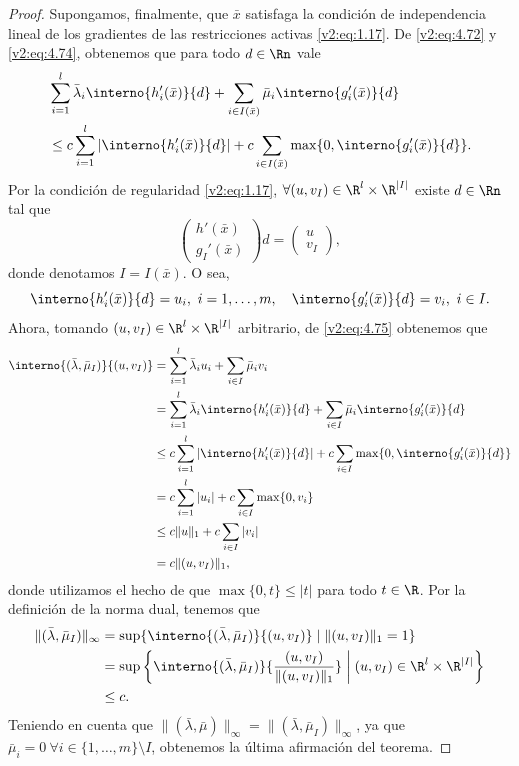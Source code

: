 \begin{proof}
    Supongamos, finalmente, que $\bar{x}$ satisfaga la condición de independencia lineal de los gradientes de las restricciones activas \eqref{v2:eq:1.17}. De \eqref{v2:eq:4.72} y \eqref{v2:eq:4.74}, obtenemos que para todo $d \in \Rn$ vale
    \begin{align}
        &\sum_{i=1}^l \bar{\lambda}_i \interno{h_i'(\bar{x})}{d} + \sum_{i \in I(\bar{x})} \bar{\mu}_i \interno{g_i'(\bar{x})}{d} \nonumber \\
        &\le c \sum_{i=1}^l |\interno{h_i'(\bar{x})}{d}| + c \sum_{i \in I(\bar{x})} \max\{0, \interno{g_i'(\bar{x})}{d}\}. \label{v2:eq:4.75}
    \end{align}
    Por la condición de regularidad \eqref{v2:eq:1.17}, $\forall (u, v_I) \in \R^l \times \R^{|I|}$ existe $d \in \Rn$ tal que
    \[
        \begin{pmatrix} h'(\bar{x}) \\ g_I'(\bar{x}) \end{pmatrix} d = \begin{pmatrix} u \\ v_I \end{pmatrix},
    \]
    donde denotamos $I = I(\bar{x})$. O sea,
    \[
        \interno{h_i'(\bar{x})}{d} = u_i, \ i = 1, \dots, m, \quad \interno{g_i'(\bar{x})}{d} = v_i, \ i \in I.
    \]
    Ahora, tomando $(u, v_I) \in \R^l \times \R^{|I|}$ arbitrario, de \eqref{v2:eq:4.75} obtenemos que
    \begin{align*}
        \interno{(\bar{\lambda}, \bar{\mu}_I)}{(u, v_I)} &= \sum_{i=1}^l \bar{\lambda}_i u_i + \sum_{i \in I} \bar{\mu}_i v_i \\
        &= \sum_{i=1}^l \bar{\lambda}_i \interno{h_i'(\bar{x})}{d} + \sum_{i \in I} \bar{\mu}_i \interno{g_i'(\bar{x})}{d} \\
        &\le c \sum_{i=1}^l |\interno{h_i'(\bar{x})}{d}| + c \sum_{i \in I} \max\{0, \interno{g_i'(\bar{x})}{d}\} \\
        &= c \sum_{i=1}^l |u_i| + c \sum_{i \in I} \max\{0, v_i\} \\
        &\le c \|u\|_1 + c \sum_{i \in I} |v_i| \\
        &= c \|(u, v_I)\|_1,
    \end{align*}
    donde utilizamos el hecho de que $\max\{0, t\} \le |t|$ para todo $t \in \R$. Por la definición de la norma dual, tenemos que
    \begin{align*}
        \|(\bar{\lambda}, \bar{\mu}_I)\|_\infty &= \sup \{ \interno{(\bar{\lambda}, \bar{\mu}_I)}{(u, v_I)} \mid \|(u, v_I)\|_1 = 1 \} \\
        &= \sup \left\{ \interno{(\bar{\lambda}, \bar{\mu}_I)}{\frac{(u, v_I)}{\|(u, v_I)\|_1}} \mathrel{\bigg|} (u, v_I) \in \R^l \times \R^{|I|} \right\} \\
        &\le c.
    \end{align*}
    Teniendo en cuenta que $\|(\bar{\lambda}, \bar{\mu})\|_\infty = \|(\bar{\lambda}, \bar{\mu}_I)\|_\infty$, ya que $\bar{\mu}_i = 0 \ \forall i \in \{1, \dots, m\} \setminus I$, obtenemos la última afirmación del teorema.
\end{proof}

